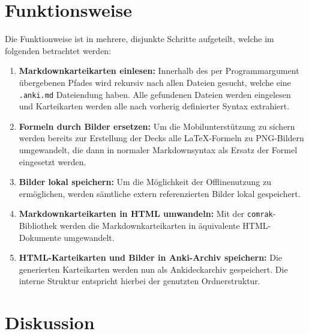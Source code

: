 \documentclass[ngerman]{article}
\begin{document}
\section{Funktionsweise}
Die Funktionweise ist in mehrere, disjunkte Schritte aufgeteilt, welche im folgenden betrachtet werden:
\begin{enumerate}
  \item \textbf{Markdownkarteikarten einlesen:} Innerhalb des per Programmargument übergebenen Pfades wird rekursiv nach allen Dateien gesucht, welche eine \texttt{.anki.md} Dateiendung haben. Alle gefundenen Dateien werden eingelesen und Karteikarten werden alle nach vorherig definierter Syntax extrahiert.
  \item \textbf{Formeln durch Bilder ersetzen:} Um die Mobilunterstützung zu sichern werden bereits zur Erstellung der Decks alle \LaTeX-Formeln zu PNG-Bildern umgewandelt, die dann in normaler Markdownsyntax als Ersatz der Formel eingesetzt werden.
  \item \textbf{Bilder lokal speichern:} Um die Möglichkeit der Offlinenutzung zu ermöglichen, werden sämtliche extern referenzierten Bilder lokal gespeichert.
  \item \textbf{Markdownkarteikarten in HTML umwandeln:} Mit der \texttt{comrak}-Bibliothek \cite{comrak} werden die Markdownkarteikarten in äquivalente HTML-Dokumente umgewandelt.
  \item \textbf{HTML-Karteikarten und Bilder in Anki-Archiv speichern:} Die generierten Karteikarten werden nun als Ankideckarchiv gespeichert. Die interne Struktur entspricht hierbei der genutzten Ordnerstruktur.
\end{enumerate}
\section{Diskussion}
\end{document}
